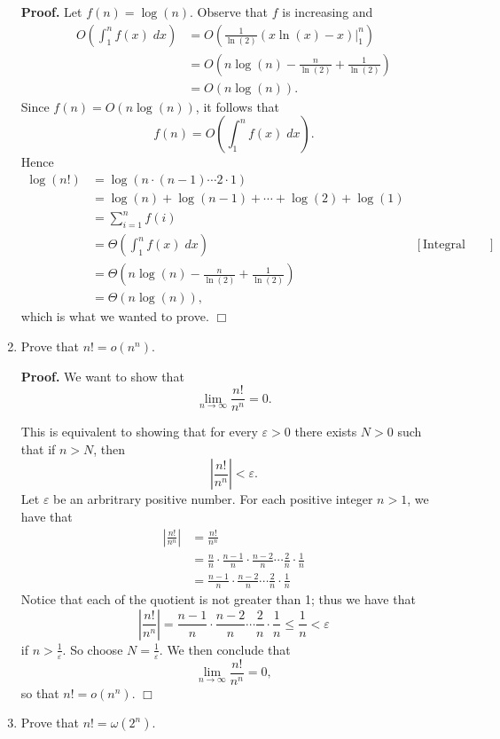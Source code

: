 \documentclass[9pt]{article}
\newcommand{\qed}{\hfill \ensuremath{\Box}}
\begin{document}
\begin{enumerate}
      \textbf{Proof.} Let $f(n) = \log(n)$. Observe that $f$ is increasing and
      \begin{align*}
         O\left(\int_1^nf(x)\;dx\right) &=
            O\left(\frac{1}{\ln(2)}(x\ln(x) - x)\bigg|_1^n\right) \\
            &= O\left(n\log(n) - \frac{n}{\ln(2)} + \frac{1}{\ln(2)}\right) \\
            &= O(n\log(n)).
      \end{align*}
      Since $f(n) = O(n\log(n))$, it follows that
      $$f(n) = O\left(\int_1^nf(x)\;dx\right).$$
      Hence
      \begin{align*}
         \log(n!) &= \log(n \cdot (n - 1) \cdots 2 \cdot 1) \\
            &= \log(n) + \log(n-1) + \cdots + \log(2) + \log(1) \\
            &= \sum_{i=1}^nf(i) \\
            &= \Theta\left(\int_1^nf(x)\;dx\right) &[\text{Integral Theorem}] \\
            &= \Theta\left(n\log(n) - \frac{n}{\ln(2)} +
                  \frac{1}{\ln(2)}\right) \\
            &= \Theta(n\log(n)),
      \end{align*}
      which is what we wanted to prove. \qed
   \item Prove that $n! = o(n^n)$.

      \textbf{Proof.} We want to show that
      $$\lim_{n \rightarrow \infty} \frac{n!}{n^n} = 0.$$
   
      This is equivalent to showing that for every $\varepsilon > 0$ there
      exists $N > 0$ such that if $n > N$, then
      $$\left|\frac{n!}{n^n}\right| < \varepsilon.$$
      Let $\varepsilon$ be an arbritrary positive number. For each positive
      integer $n > 1$, we have that
      \begin{align*}
         \left|\frac{n!}{n^n}\right| &= \frac{n!}{n^n} \\
            &= \frac{n}{n} \cdot \frac{n-1}{n} \cdot \frac{n-2}{n} \cdots
               \frac{2}{n} \cdot \frac{1}{n} \\
            &= \frac{n-1}{n} \cdot \frac{n-2}{n} \cdots
               \frac{2}{n} \cdot \frac{1}{n}
      \end{align*}
      Notice that each of the quotient is not greater than 1; thus we have
      that
      $$\left|\frac{n!}{n^n}\right| = \frac{n-1}{n} \cdot \frac{n-2}{n} \cdots
        \frac{2}{n} \cdot \frac{1}{n} \le \frac{1}{n} < \varepsilon$$
      if $n > \frac{1}{\varepsilon}$. So choose $N = \frac{1}{\varepsilon}$. We
      then conclude that
      $$\lim_{n \rightarrow \infty} \frac{n!}{n^n} = 0,$$
      so that $n! = o(n^n)$. \qed
   \item Prove that $n! = \omega(2^n)$.


\end{enumerate}
\end{document}
